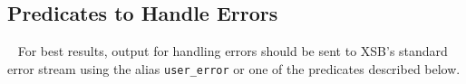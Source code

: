 %
%
%
%

\subsection{Predicates to Handle Errors}~\label{sec:catch}
%
For best results, output for handling errors should be sent to XSB's
standard error stream using the alias {\tt user\_error} or one of the
predicates described below.

